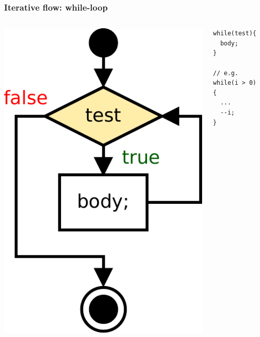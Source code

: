 \begin{frame}[fragile]
\frametitle{Iterative flow: while-loop}
\begin{columns}[c]
  \begin{column}{0.5\textwidth}
  \hfill
\includegraphics[scale=0.5]{figures/flow-while}
  \end{column}
  \begin{column}{0.5\textwidth}
\begin{lstlisting}
while(test){
  body;
}

// e.g.
while(i > 0){
  ...
  --i;
}
\end{lstlisting}
  \end{column}
\end{columns}
\end{frame}

